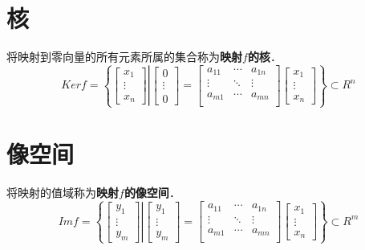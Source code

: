 \documentclass[12pt]{article}
\begin{document}
\begin{CJK}{UTF8}{gbsn}
\section{核}
将映射到零向量的所有元素所属的集合称为\textbf{映射$f$的核}．
\begin{equation}
Kerf = \left\lbrace
\left[
\left.
\begin{array}{c}
x_1\\
\vdots\\
x_n
\end{array}
\right]
\right|
\left[
\begin{array}{c}
0\\
\vdots\\
0
\end{array}
\right]=
\left[
\begin{array}{ccc}
a_{11} & \cdots & a_{1n}\\
\vdots & \ddots & \vdots\\
a_{m1} & \cdots & a_{mn}\\
\end{array}
\right]
\left[
\begin{array}{c}
x_1\\
\vdots\\
x_n
\end{array}
\right]
\right\rbrace
\subset R^n
\end{equation}

\section{像空间}
将映射的值域称为\textbf{映射$f$的像空间}．
\begin{equation}
Imf = \left\lbrace
\left[
\left.
\begin{array}{c}
y_1\\
\vdots\\
y_m
\end{array}
\right]
\right|
\left[
\begin{array}{c}
y_1\\
\vdots\\
y_m
\end{array}
\right]=
\left[
\begin{array}{ccc}
a_{11} & \cdots & a_{1n}\\
\vdots & \ddots & \vdots\\
a_{m1} & \cdots & a_{mn}\\
\end{array}
\right]
\left[
\begin{array}{c}
x_1\\
\vdots\\
x_n
\end{array}
\right]
\right\rbrace
\subset R^m
\end{equation}


\end{CJK}
\end{document}
